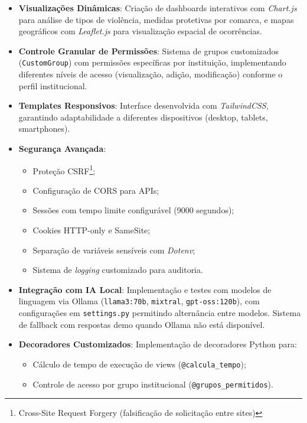 \begin{itemize}
\item \textbf{Visualizações Dinâmicas}: Criação de dashboards interativos com \textit{Chart.js} para análise de tipos de violência, medidas protetivas por comarca, e mapas geográficos com \textit{Leaflet.js} para visualização espacial de ocorrências.

\item \textbf{Controle Granular de Permissões}: Sistema de grupos customizados (\texttt{CustomGroup}) com permissões específicas por instituição, implementando diferentes níveis de acesso (visualização, adição, modificação) conforme o perfil institucional.

\item \textbf{Templates Responsivos}: Interface desenvolvida com \textit{TailwindCSS}, garantindo adaptabilidade a diferentes dispositivos (desktop, tablets, smartphones).

\item \textbf{Segurança Avançada}: 
   \begin{itemize}
      \item Proteção CSRF\footnote{Cross-Site Request Forgery (falsificação de solicitação entre sites)};
      \item Configuração de CORS para APIs;
      \item Sessões com tempo limite configurável (9000 segundos);
      \item Cookies HTTP-only e SameSite;
      \item Separação de variáveis sensíveis com \textit{Dotenv};
      \item Sistema de \textit{logging} customizado para auditoria.
   \end{itemize}

\item \textbf{Integração com IA Local}: Implementação e testes com modelos de linguagem via Ollama (\texttt{llama3:70b}, \texttt{mixtral}, \texttt{gpt-oss:120b}), com configurações em \texttt{settings.py} permitindo alternância entre modelos. Sistema de fallback com respostas demo quando Ollama não está disponível.

\item \textbf{Decoradores Customizados}: Implementação de decoradores Python para:
   \begin{itemize}
      \item Cálculo de tempo de execução de views (\texttt{@calcula\_tempo});
      \item Controle de acesso por grupo institucional (\texttt{@grupos\_permitidos}).
   \end{itemize}
\end{itemize}

